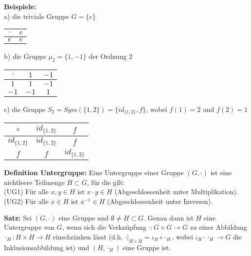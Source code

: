 \documentclass[11pt]{article}
\begin{document}
		\textbf{Beispiele:} \\
		a) die triviale Gruppe $G=\{e\}$
		\begin{center}
			\begin{tabular}{|c|c|}
				\hline
				$\cdot$ & $e$\\
				\hline
				$e$ & $e$ \\
				\hline
			\end{tabular}
		\end{center}
		b) die Gruppe $\mu_2 = \{1,-1\}$ der Ordnung 2
		\begin{center}
			\begin{tabular}{|c|c|c|}
				\hline
				$\cdot$ & $1$ & $-1$\\
				\hline
				$1$ & $1$ & $-1$ \\
				\hline
				$-1$ & $-1$ & $1$ \\
				\hline
			\end{tabular}
		\end{center}
		c) die Gruppe $S_2= Sym(\{1,2\}) = \{id_{\{1,2\}},f\}$, wobei $f(1)=2$ und $f(2)=1$
		\begin{center}
			\begin{tabular}{|c|c|c|}
				\hline
				$\circ$ & $id_{\{1,2\}}$ & $f$\\
				\hline
				$id_{\{1,2\}}$ & $id_{\{1,2\}}$ & $f$ \\
				\hline
				$f$ & $f$ & $id_{\{1,2\}}$ \\
				\hline
			\end{tabular}
		\end{center}
		
		\begin{mdframed}[backgroundcolor=blue!20]
			\textbf{Definition Untergruppe:} Eine Untergruppe einer Gruppe $(G,\cdot)$ ist eine 
			nichtleere Teilmenge $H \subset G$, f\"ur die gilt: \\
			(UG1) F\"ur alle $x,y \in H$ ist $x \cdot y \in H$ (Abgeschlossenheit unter Multiplikation). \\
			(UG2) F\"ur alle $x \in H$ ist $x^{-1} \in H$ (Abgeschlossenheit unter Inversen).
		\end{mdframed}
		
		\begin{framed}
			\textbf{Satz:} Sei $(G,\cdot)$ eine Gruppe und $\emptyset \neq H \subset G$. Genau dann ist
			$H$ eine Untergruppe von $G$, wenn sich die Verkn\"upfung $\cdot: G \times G \to G$ zu einer
			Abbildung $\cdot_H: H \times H \to H$ einschr\"anken l\"asst (d.h. $\cdot|_{H \times H}=
			\iota_H \circ \cdot_H$, wobei $\iota_H \cdot \cdot_H \to G$ die Inklusionsabbildung ist) und
			$(H,\cdot_H)$ eine Gruppe ist.
		\end{framed}
		
\end{document}
